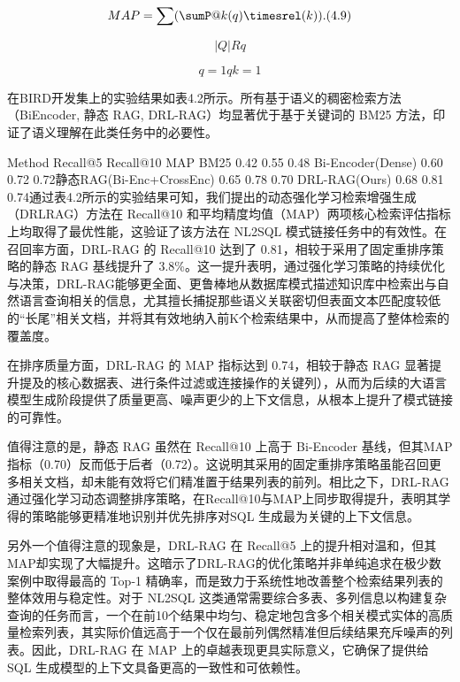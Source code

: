 \documentclass[12pt,a4paper,openright,UTF8]{ctexbook}
\begin{document}
\begin{equation}
MAP = \sum( \sumP@k(q)\timesrel (k)). (4.9)
\end{equation}


\begin{equation}
|Q| R q
\end{equation}


\begin{equation}
q=1 q k=1
\end{equation}

在BIRD开发集上的实验结果如表4.2所示。所有基于语义的稠密检索方法（BiEncoder, 静态 RAG, DRL-RAG）均显著优于基于关键词的 BM25 方法，印证了语义理解在此类任务中的必要性。

\begin{table}[htbp]
\centering
\caption{表4.2不同方法在BIRD数据集模式链接检索任务上的性能对比}
\end{table}

Method Recall@5 Recall@10 MAP BM25 0.42 0.55 0.48 Bi-Encoder(Dense) 0.60 0.72 0.72静态RAG(Bi-Enc+CrossEnc) 0.65 0.78 0.70 DRL-RAG(Ours) 0.68 0.81 0.74通过表4.2所示的实验结果可知，我们提出的动态强化学习检索增强生成（DRLRAG）方法在 Recall@10 和平均精度均值（MAP）两项核心检索评估指标上均取得了最优性能，这验证了该方法在 NL2SQL 模式链接任务中的有效性。在召回率方面，DRL-RAG 的 Recall@10 达到了 0.81，相较于采用了固定重排序策略的静态 RAG 基线提升了 3.8\%。这一提升表明，通过强化学习策略的持续优化与决策，DRL-RAG能够更全面、更鲁棒地从数据库模式描述知识库中检索出与自然语言查询相关的信息，尤其擅长捕捉那些语义关联密切但表面文本匹配度较低的“长尾”相关文档，并将其有效地纳入前K个检索结果中，从而提高了整体检索的覆盖度。


在排序质量方面，DRL-RAG 的 MAP 指标达到 0.74，相较于静态 RAG 显著提升提及的核心数据表、进行条件过滤或连接操作的关键列），从而为后续的大语言模型生成阶段提供了质量更高、噪声更少的上下文信息，从根本上提升了模式链接的可靠性。


值得注意的是，静态 RAG 虽然在 Recall@10 上高于 Bi-Encoder 基线，但其MAP指标（0.70）反而低于后者（0.72）。这说明其采用的固定重排序策略虽能召回更多相关文档，却未能有效将它们精准置于结果列表的前列。相比之下，DRL-RAG通过强化学习动态调整排序策略，在Recall@10与MAP上同步取得提升，表明其学得的策略能够更精准地识别并优先排序对SQL 生成最为关键的上下文信息。


另外一个值得注意的现象是，DRL-RAG 在 Recall@5 上的提升相对温和，但其MAP却实现了大幅提升。这暗示了DRL-RAG的优化策略并非单纯追求在极少数案例中取得最高的 Top-1 精确率，而是致力于系统性地改善整个检索结果列表的整体效用与稳定性。对于 NL2SQL 这类通常需要综合多表、多列信息以构建复杂查询的任务而言，一个在前10个结果中均匀、稳定地包含多个相关模式实体的高质量检索列表，其实际价值远高于一个仅在最前列偶然精准但后续结果充斥噪声的列表。因此，DRL-RAG 在 MAP 上的卓越表现更具实际意义，它确保了提供给SQL 生成模型的上下文具备更高的一致性和可依赖性。
\end{document}
